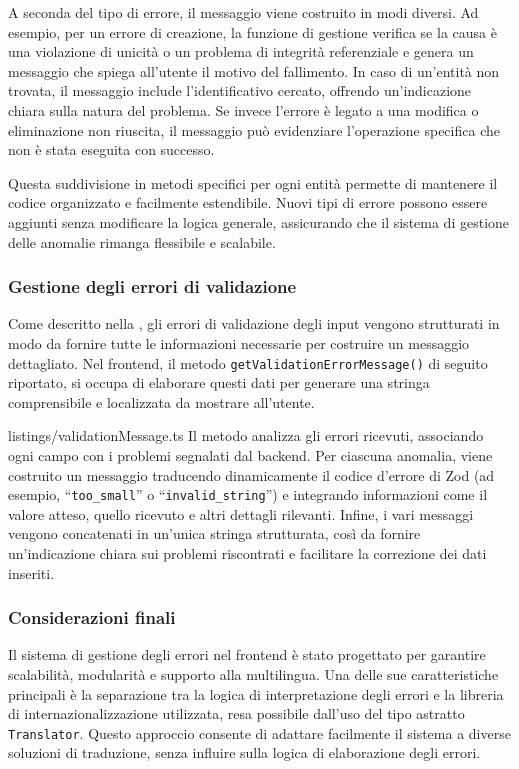 A seconda del tipo di errore, il messaggio viene costruito in modi diversi. Ad esempio, per un errore di creazione, la funzione di gestione verifica se la causa è una violazione di unicità o un problema di integrità referenziale e genera un messaggio che spiega all’utente il motivo del fallimento. In caso di un’entità non trovata, il messaggio include l’identificativo cercato, offrendo un'indicazione chiara sulla natura del problema. Se invece l’errore è legato a una modifica o eliminazione non riuscita, il messaggio può evidenziare l’operazione specifica che non è stata eseguita con successo.

Questa suddivisione in metodi specifici per ogni entità permette di mantenere il codice organizzato e facilmente estendibile. Nuovi tipi di errore possono essere aggiunti senza modificare la logica generale, assicurando che il sistema di gestione delle anomalie rimanga flessibile e scalabile.

\subsubsection{Gestione degli errori di validazione}
Come descritto nella , gli errori di validazione degli input vengono strutturati in modo da fornire tutte le informazioni necessarie per costruire un messaggio dettagliato. Nel frontend, il metodo \texttt{getValidationErrorMessage()} di seguito riportato, si occupa di elaborare questi dati per generare una stringa comprensibile e localizzata da mostrare all’utente.
%

{listings/validationMessage.ts}
%
Il metodo analizza gli errori ricevuti, associando ogni campo con i problemi segnalati dal backend. Per ciascuna anomalia, viene costruito un messaggio traducendo dinamicamente il codice d’errore di Zod (ad esempio, ``\texttt{too\_small}'' o ``\texttt{invalid\_string}'') e integrando informazioni come il valore atteso, quello ricevuto e altri dettagli rilevanti. Infine, i vari messaggi vengono concatenati in un'unica stringa strutturata, così da fornire un’indicazione chiara sui problemi riscontrati e facilitare la correzione dei dati inseriti.

\subsubsection{Considerazioni finali}
Il sistema di gestione degli errori nel frontend è stato progettato per garantire scalabilità, modularità e supporto alla multilingua. Una delle sue caratteristiche principali è la separazione tra la logica di interpretazione degli errori e la libreria di internazionalizzazione utilizzata, resa possibile dall’uso del tipo astratto \texttt{Translator}. Questo approccio consente di adattare facilmente il sistema a diverse soluzioni di traduzione, senza influire sulla logica di elaborazione degli errori.

